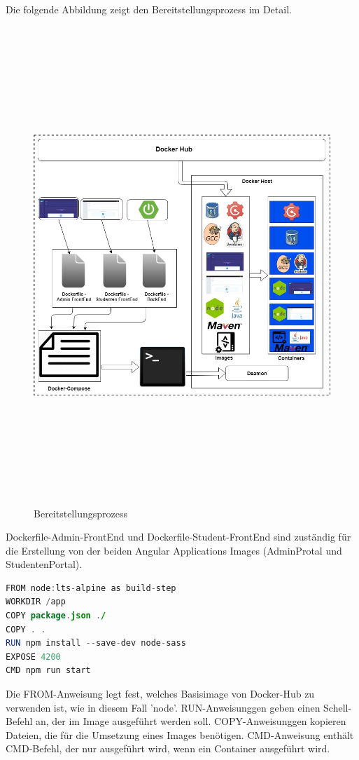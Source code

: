 \documentclass[a4paper,12pt,oneside]{book}
\begin{document}
\newline
Die folgende Abbildung zeigt den Bereitstellungsprozess im Detail.
\newpage
\begin{figure}[h!]
	\begin{center}
		\includegraphics[width=16cm, height=18cm]{Application-deployment.jpg}
		\caption{Bereitstellungsprozess} 
		\label{Bereitstellungsprozess} 
	\end{center}
\end{figure}
\newpage
Dockerfile-Admin-FrontEnd und Dockerfile-Student-FrontEnd sind zuständig für die Erstellung von der beiden Angular Applications Images (AdminProtal und StudentenPortal).
\begin{lstlisting}[language=JAVA,caption=Dockerfile für Angular Application]
FROM node:lts-alpine as build-step
WORKDIR /app
COPY package.json ./
COPY . .
RUN npm install --save-dev node-sass
EXPOSE 4200
CMD npm run start
\end{lstlisting}
Die FROM-Anweisung legt fest, welches Basisimage von Docker-Hub zu verwenden ist,  wie in diesem Fall 'node'. RUN-Anweisunggen geben einen Schell-Befehl an, der im Image ausgeführt werden soll. COPY-Anweisunggen kopieren Dateien, die für die Umsetzung eines Images benötigen. CMD-Anweisung enthält CMD-Befehl, der nur ausgeführt wird, wenn ein Container ausgeführt wird.
\end{document}

